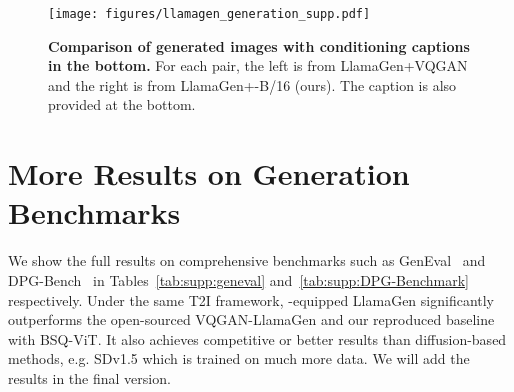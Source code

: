 \begin{table}[!tb]
    \centering
    \caption{\textbf{Hyperparamters for ImageNet linear probing.}}
    \label{tab:supp:hyperparam:linear}
\end{table}

\begin{figure*}[!tb]
    \centering
    \texttt{[image: figures/llamagen\_generation\_supp.pdf]}
    \vspace{-15pt}
    \caption{\textbf{Comparison of generated images with conditioning captions in the bottom.}
    For each pair, the left is from LlamaGen+VQGAN and the right is from LlamaGen+\ours-B/16 (ours).
    The caption is also provided at the bottom.
    }
    \label{fig:supp:t2i_vis}
\end{figure*}

\section{More Results on Generation Benchmarks}
\label{sec:supp:geneval}

We show the full results on comprehensive benchmarks such as GenEval~\cite{ghosh2024geneval} and DPG-Bench~\cite{hu2024ella} in Tables~\ref{tab:supp:geneval} and~\ref{tab:supp:DPG-Benchmark} respectively.
Under the same T2I framework, \ours-equipped LlamaGen significantly outperforms the open-sourced VQGAN-LlamaGen and our reproduced baseline with BSQ-ViT.
It also achieves competitive or better results than diffusion-based methods, e.g. SDv1.5 which is trained on much more data. We will add the results in the final version. 

